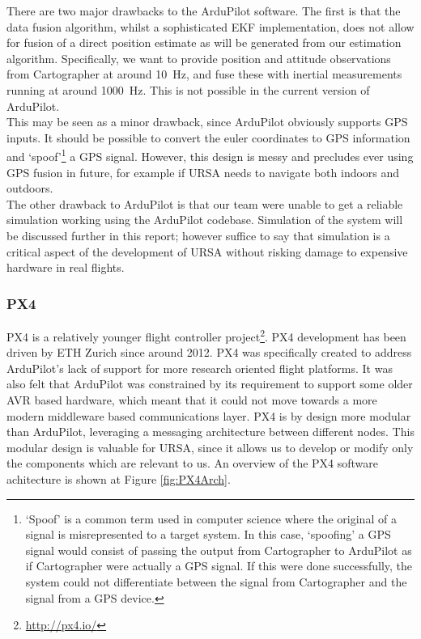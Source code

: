 \documentclass[capstone_report.tex]{subfiles}
\begin{document}
There are two major drawbacks to the ArduPilot software. The first is that the data fusion algorithm, whilst a sophisticated EKF implementation, does not allow for fusion of a direct position estimate as will be generated from our estimation algorithm. Specifically, we want to provide position and attitude observations from Cartographer at around \SI{10}{\hertz}, and fuse these with inertial measurements running at around \SI{1000}{\hertz}. This is not possible in the current version of ArduPilot.\\

This may be seen as a minor drawback, since ArduPilot obviously supports GPS inputs. It should be possible to convert the euler coordinates to GPS information and `spoof'\footnote{`Spoof' is a common term used in computer science where the original of a signal is misrepresented to a target system. In this case, `spoofing' a GPS signal would consist of passing the output from Cartographer to ArduPilot as if Cartographer were actually a GPS signal. If this were done successfully, the system could not differentiate between the signal from Cartographer and the signal from a GPS device.} a GPS signal. However, this design is messy and precludes ever using GPS fusion in future, for example if URSA needs to navigate both indoors and outdoors. \\

The other drawback to ArduPilot is that our team were unable to get a reliable simulation working using the ArduPilot codebase. Simulation of the system will be discussed further in this report; however suffice to say that simulation is a critical aspect of the development of URSA without risking damage to expensive hardware in real flights.

\subsubsection{PX4}
PX4 is a relatively younger flight controller project\footnote{\url{http://px4.io/}}. PX4 development has been driven by ETH Zurich since around 2012. PX4 was specifically created to address ArduPilot's lack of support for more research oriented flight platforms. It was also felt that ArduPilot was constrained by its requirement to support some older AVR based hardware, which meant that it could not move towards a more modern middleware based communications layer. PX4 is by design more modular than ArduPilot, leveraging a messaging architecture between different nodes. This modular design is valuable for URSA, since it allows us to develop or modify only the components which are relevant to us. An overview of the PX4 software achitecture is shown at Figure \ref{fig:PX4Arch}.\\
\end{document}
